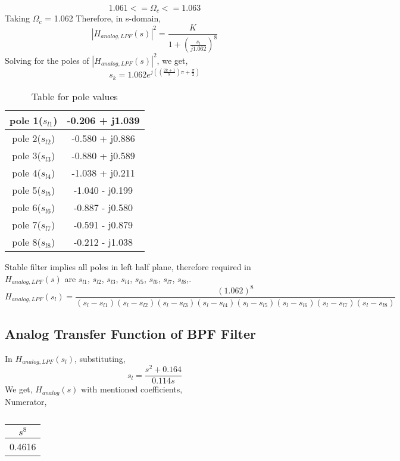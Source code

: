 \documentclass[12pt]{article}
\begin{document}
\begin{equation}
    1.061 <= \Omega_c <= 1.063
\end{equation}
Taking $\Omega_c$ = 1.062
Therefore, in s-domain,\\
\begin{equation}
    |H_{analog,LPF}(s)|^2 = \frac{K}{1 + (\frac{s_l}{j1.062})^{8}}
\end{equation}
Solving for the poles of $|H_{analog,LPF}(s)|^2$, we get,
\begin{equation}
    s_k = 1.062 e^{j((\frac{2k+1}{8})\pi+\frac{\pi}{2})}
\end{equation}
\begin{table}[H]
\centering  %
\begin{tabular}{|c|c|}
\hline  %
pole 1($s_{l1}$)	&	-0.206 +  j1.039	\\ \hline
pole 2($s_{l2}$)	&	-0.580 +  j0.886   \\ \hline
pole 3($s_{l3}$)	&	-0.880 +  j0.589   \\ \hline
pole 4($s_{l4}$)	&	-1.038 +  j0.211	\\ \hline
pole 5($s_{l5}$)	&	-1.040 -  j0.199	\\ \hline
pole 6($s_{l6}$)	&	-0.887 -  j0.580   \\ \hline
pole 7($s_{l7}$)	&	-0.591 -  j0.879   \\ \hline
pole 8($s_{l8}$)	&	-0.212 -  j1.038	\\ \hline
\hline    %
\end{tabular}
\caption{Table for pole values}
\end{table}
Stable filter implies all poles in left half plane, therefore required in $H_{analog,LPF}(s)$ are $s_{l1}$, $s_{l2}$, $s_{l3}$, $s_{l4}$, $s_{l5}$, $s_{l6}$, $s_{l7}$, $s_{l8}$,. 
\begin{equation}
     H_{analog,LPF}(s_l) = \frac{(1.062)^8}{(s_l-s_{l1})(s_l-s_{l2})(s_l-s_{l3})(s_l-s_{l4})(s_l-s_{l5})(s_l-s_{l6})(s_l-s_{l7})(s_l-s_{l8})}
\end{equation}
\subsection{Analog Transfer Function of BPF Filter}
In $H_{analog,LPF}(s_l)$, substituting,
\begin{equation}
    s_l = \frac{s^2+0.164}{0.114s}
\end{equation}
We get, $H_{analog}(s)$ with mentioned coefficients,\\
Numerator,
\begin{table}[H]
\centering  %
\begin{tabular}{|c|}
\hline  %
$s^8$\\ \hline
 0.4616 \\
\hline    %
\end{tabular}
\caption{}
\end{table}
\end{document}
